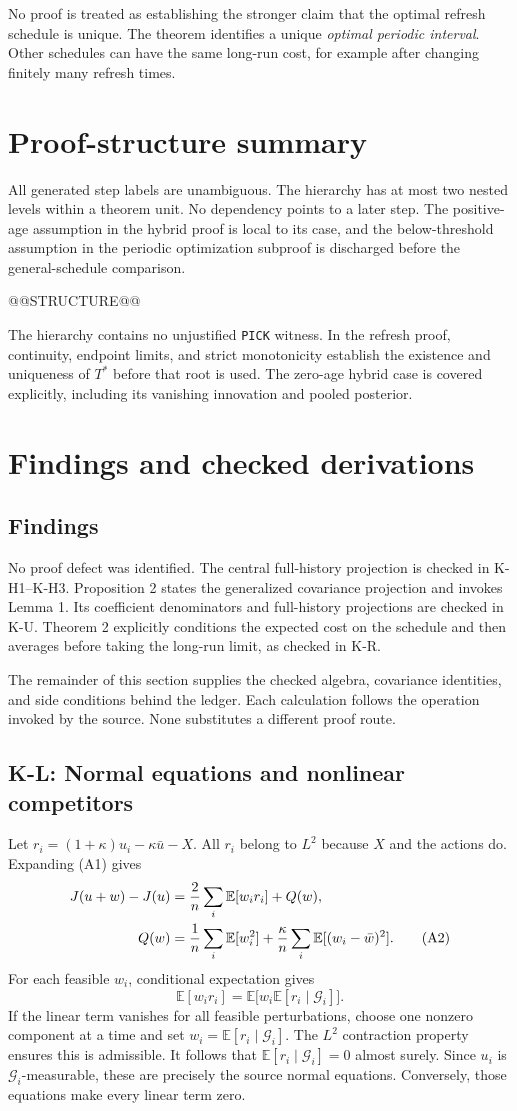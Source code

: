 \documentclass[11pt,letterpaper]{article}
\newcommand{\E}{\mathbb E}
\newcommand{\G}{\mathcal G}
\newcommand{\calculation}[2]{\subsection{#1: #2}}
\begin{document}
No proof is treated as establishing the stronger claim that the optimal refresh schedule is unique. The theorem identifies a unique \emph{optimal periodic interval}. Other schedules can have the same long-run cost, for example after changing finitely many refresh times.

\section{Proof-structure summary}
All generated step labels are unambiguous. The hierarchy has at most two nested levels within a theorem unit. No dependency points to a later step. The positive-age assumption in the hybrid proof is local to its case, and the below-threshold assumption in the periodic optimization subproof is discharged before the general-schedule comparison.

{\small @@STRUCTURE@@}

The hierarchy contains no unjustified \texttt{PICK} witness. In the refresh proof, continuity, endpoint limits, and strict monotonicity establish the existence and uniqueness of $T^*$ before that root is used. The zero-age hybrid case is covered explicitly, including its vanishing innovation and pooled posterior.

\section{Findings and checked derivations}
\subsection{Findings}
No proof defect was identified. The central full-history projection is checked in K-H1--K-H3. Proposition 2 states the generalized covariance projection and invokes Lemma 1. Its coefficient denominators and full-history projections are checked in K-U. Theorem 2 explicitly conditions the expected cost on the schedule and then averages before taking the long-run limit, as checked in K-R.

The remainder of this section supplies the checked algebra, covariance identities, and side conditions behind the ledger. Each calculation follows the operation invoked by the source. None substitutes a different proof route.

\calculation{K-L}{Normal equations and nonlinear competitors}
Let $r_i=(1+\kappa)u_i-\kappa\bar u-X$. All $r_i$ belong to $L^2$ because $X$ and the actions do. Expanding (A1) gives
\begin{align}
J(u+w)-J(u)
&=\frac2n\sum_i\E[w_i r_i]+Q(w),\notag\\
Q(w)&=\frac1n\sum_i\E[w_i^2]
+\frac\kappa n\sum_i\E[(w_i-\bar w)^2].\tag{A2}
\end{align}
For each feasible $w_i$, conditional expectation gives
\[
\E[w_i r_i]=\E\bigl[w_i\E[r_i\mid\G_i]\bigr].
\]
If the linear term vanishes for all feasible perturbations, choose one nonzero component at a time and set $w_i=\E[r_i\mid\G_i]$. The $L^2$ contraction property ensures this is admissible. It follows that $\E[r_i\mid\G_i]=0$ almost surely. Since $u_i$ is $\G_i$-measurable, these are precisely the source normal equations. Conversely, those equations make every linear term zero.
\end{document}
